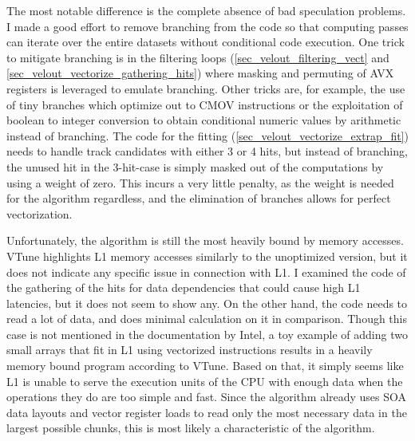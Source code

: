 \documentclass[12pt]{article}
\begin{document}
The most notable difference is the complete absence of bad speculation problems. I made a good effort to remove branching from the code so that computing passes can iterate over the entire datasets without conditional code execution. One trick to mitigate branching is in the filtering loops (\ref{sec_velout_filtering_vect} and \ref{sec_velout_vectorize_gathering_hits}) where masking and permuting of AVX registers is leveraged to emulate branching. Other tricks are, for example, the use of tiny branches which optimize out to CMOV instructions or the exploitation of boolean to integer conversion to obtain conditional numeric values by arithmetic instead of branching. The code for the fitting (\ref{sec_velout_vectorize_extrap_fit}) needs to handle track candidates with either 3 or 4 hits, but instead of branching, the unused hit in the 3-hit-case is simply masked out of the computations by using a weight of zero. This incurs a very little penalty, as the weight is needed for the algorithm regardless, and the elimination of branches allows for perfect vectorization.

\vspace{1pc}

Unfortunately, the algorithm is still the most heavily bound by memory accesses. VTune highlights L1 memory accesses similarly to the unoptimized version, but it does not indicate any specific issue in connection with L1. I examined the code of the gathering of the hits for data dependencies that could cause high L1 latencies, but it does not seem to show any. On the other hand, the code needs to read a lot of data, and does minimal calculation on it in comparison. Though this case is not mentioned in the documentation by Intel, a toy example of adding two small arrays that fit in L1 using vectorized instructions results in a heavily memory bound program according to VTune. Based on that, it simply seems like L1 is unable to serve the execution units of the CPU with enough data when the operations they do are too simple and fast. Since the algorithm already uses SOA data layouts and vector register loads to read only the most necessary data in the largest possible chunks, this is most likely a characteristic of the algorithm.

\vspace{1pc}
\end{document}
